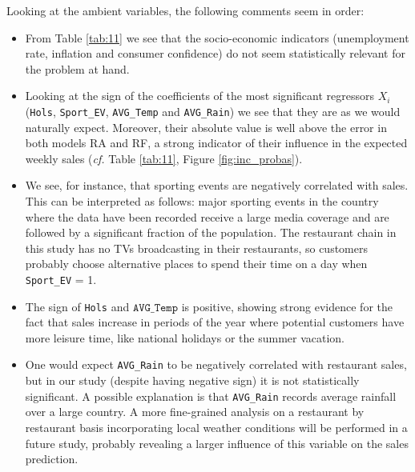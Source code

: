 
Looking at the ambient variables, the following comments seem in order:
\begin{itemize}

\item From Table \ref{tab:11} we see that the socio-economic indicators (unemployment rate, inflation and consumer confidence) do not seem statistically relevant for the problem at hand. 

\item Looking at the sign of the coefficients of the most significant regressors $X_i$ (\texttt{Hols}, \texttt{Sport\_EV}, \texttt{AVG\_Temp} and \texttt{AVG\_Rain}) we see that they are as we would naturally expect. Moreover, their absolute value is well above the error in both models RA and RF, a strong indicator of their influence in the expected weekly sales (\emph{cf.} Table \ref{tab:11}, Figure \ref{fig:inc_probas}). 

\item We see, for instance, that sporting events are negatively correlated with sales. This can be interpreted as follows: major sporting events in the country where the data have been recorded receive a large media coverage and are followed by a significant fraction of the population. The restaurant chain in this study has no TVs broadcasting in their restaurants, so customers probably choose alternative places to spend their time on a day when \texttt{Sport\_EV} = 1. 

\item The sign of \texttt{Hols} and $\texttt{AVG\_Temp}$ is positive, showing strong evidence for the fact that sales increase in periods of the year where potential customers have more leisure time, like national holidays or the summer vacation. 

\item One would expect \texttt{AVG\_Rain} to be negatively correlated with restaurant sales, but in our study (despite having negative sign) it is not statistically significant. A possible explanation is that \texttt{AVG\_Rain} records average rainfall over a large country. A more fine-grained analysis on a restaurant by restaurant basis incorporating local weather conditions will be performed in a future study, probably revealing a larger influence of this variable on the sales prediction.

\end{itemize}

